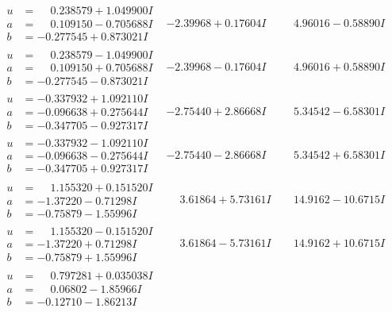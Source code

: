 \documentclass[1p]{elsarticle_modified}
\theoremstyle{definition}
\begin{document}
$$\begin{array}{c|c|c}
\begin{aligned}
u &= \phantom{-}0.238579 + 1.049900 I \\
a &= \phantom{-}0.109150 - 0.705688 I \\
b &= -0.277545 + 0.873021 I\end{aligned}
 & -2.39968 + 0.17604 I & \phantom{-}4.96016 - 0.58890 I \\ \hline\begin{aligned}
u &= \phantom{-}0.238579 - 1.049900 I \\
a &= \phantom{-}0.109150 + 0.705688 I \\
b &= -0.277545 - 0.873021 I\end{aligned}
 & -2.39968 - 0.17604 I & \phantom{-}4.96016 + 0.58890 I \\ \hline\begin{aligned}
u &= -0.337932 + 1.092110 I \\
a &= -0.096638 + 0.275644 I \\
b &= -0.347705 - 0.927317 I\end{aligned}
 & -2.75440 + 2.86668 I & \phantom{-}5.34542 - 6.58301 I \\ \hline\begin{aligned}
u &= -0.337932 - 1.092110 I \\
a &= -0.096638 - 0.275644 I \\
b &= -0.347705 + 0.927317 I\end{aligned}
 & -2.75440 - 2.86668 I & \phantom{-}5.34542 + 6.58301 I \\ \hline\begin{aligned}
u &= \phantom{-}1.155320 + 0.151520 I \\
a &= -1.37220 - 0.71298 I \\
b &= -0.75879 - 1.55996 I\end{aligned}
 & \phantom{-}3.61864 + 5.73161 I & \phantom{-}14.9162 - 10.6715 I \\ \hline\begin{aligned}
u &= \phantom{-}1.155320 - 0.151520 I \\
a &= -1.37220 + 0.71298 I \\
b &= -0.75879 + 1.55996 I\end{aligned}
 & \phantom{-}3.61864 - 5.73161 I & \phantom{-}14.9162 + 10.6715 I \\ \hline\begin{aligned}
u &= \phantom{-}0.797281 + 0.035038 I \\
a &= \phantom{-}0.06802 - 1.85966 I \\
b &= -0.12710 - 1.86213 I\end{aligned}

\end{array}$$
\end{document}
